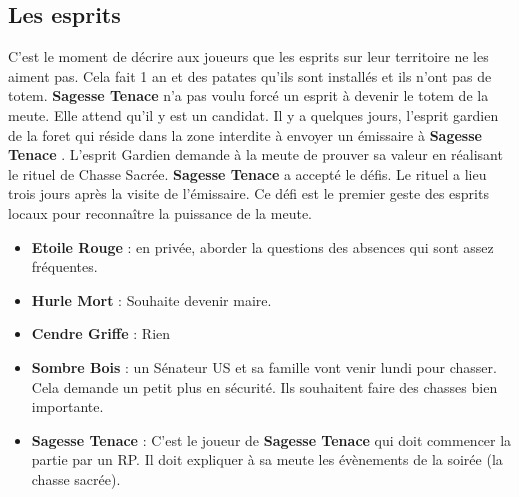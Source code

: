 \documentclass[oneside,12pt]{book}
\newcommand{\Lynn}{\textbf{Etoile Rouge} }
\newcommand{\Jessica}{\textbf{Sagesse Tenace} }
\newcommand{\Luke}{\textbf{Cendre Griffe} }
\newcommand{\Peter}{\textbf{Hurle Mort} }
\newcommand{\Leonard}{\textbf{Sombre Bois} }
\begin{document}
\begin{flushleft}
\clearpage

\subsection{Les esprits}
C'est le moment de décrire aux joueurs que les esprits sur leur territoire ne les aiment pas. Cela fait 1 an et des patates qu'ils sont installés et ils n'ont pas de totem. \Jessica n'a pas voulu forcé un esprit à devenir le totem de la meute. Elle attend qu'il y est un candidat. Il y a quelques jours, l'esprit gardien de la foret qui réside dans la zone interdite à envoyer un émissaire à \Jessica. L'esprit Gardien demande à la meute de prouver sa valeur en réalisant le rituel de Chasse Sacrée. \Jessica a accepté le défis. Le rituel a lieu trois jours après la visite de l'émissaire. Ce défi est le premier geste des esprits locaux pour reconnaître la puissance de la meute. 
\begin{itemize}
\item \Lynn : en privée, aborder la questions des absences qui sont assez fréquentes.
\item \Peter : Souhaite devenir maire.
\item \Luke : Rien
\item \Leonard : un Sénateur US et sa famille vont venir lundi pour chasser. Cela demande un petit plus en sécurité. Ils souhaitent faire des chasses bien importante. 
\item \Jessica : C'est le joueur de \Jessica qui doit commencer la partie par un RP. Il doit expliquer à sa meute les évènements de la soirée (la chasse sacrée). 
\end{itemize}



\end{flushleft}
\end{document}
